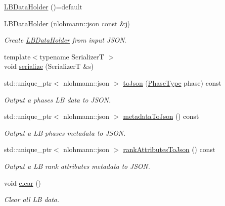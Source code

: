 \begin{DoxyCompactItemize}
\item 
\hyperlink{structvt_1_1vrt_1_1collection_1_1balance_1_1_l_b_data_holder_aa1785b744e5b844588f9e8038aa2ef1e}{L\+B\+Data\+Holder} ()=default
\item 
\hyperlink{structvt_1_1vrt_1_1collection_1_1balance_1_1_l_b_data_holder_a0bf21f167ccc736cd1f763aceda3a90d}{L\+B\+Data\+Holder} (nlohmann\+::json const \&j)
\begin{DoxyCompactList}\small\item\em Create {\ttfamily \hyperlink{structvt_1_1vrt_1_1collection_1_1balance_1_1_l_b_data_holder}{L\+B\+Data\+Holder}} from input J\+S\+ON. \end{DoxyCompactList}\item 
{\footnotesize template$<$typename SerializerT $>$ }\\void \hyperlink{structvt_1_1vrt_1_1collection_1_1balance_1_1_l_b_data_holder_ae7701331d40846773d0dc359621fab25}{serialize} (SerializerT \&s)
\item 
std\+::unique\+\_\+ptr$<$ nlohmann\+::json $>$ \hyperlink{structvt_1_1vrt_1_1collection_1_1balance_1_1_l_b_data_holder_aeea29fc72556da9038290ef94fb01bc9}{to\+Json} (\hyperlink{namespacevt_a46ce6733d5cdbd735d561b7b4029f6d7}{Phase\+Type} phase) const
\begin{DoxyCompactList}\small\item\em Output a phase\textquotesingle{}s LB data to J\+S\+ON. \end{DoxyCompactList}\item 
std\+::unique\+\_\+ptr$<$ nlohmann\+::json $>$ \hyperlink{structvt_1_1vrt_1_1collection_1_1balance_1_1_l_b_data_holder_aff15ecfd3ffecaa3f6754621c496fc8c}{metadata\+To\+Json} () const
\begin{DoxyCompactList}\small\item\em Output a LB phase\textquotesingle{}s metadata to J\+S\+ON. \end{DoxyCompactList}\item 
std\+::unique\+\_\+ptr$<$ nlohmann\+::json $>$ \hyperlink{structvt_1_1vrt_1_1collection_1_1balance_1_1_l_b_data_holder_a92eb060e578a7fb8c317d9184a7236db}{rank\+Attributes\+To\+Json} () const
\begin{DoxyCompactList}\small\item\em Output a LB rank attributes metadata to J\+S\+ON. \end{DoxyCompactList}\item 
void \hyperlink{structvt_1_1vrt_1_1collection_1_1balance_1_1_l_b_data_holder_a77ed15a18bb662403a65fa8fe4d4d6dc}{clear} ()
\begin{DoxyCompactList}\small\item\em Clear all LB data. \end{DoxyCompactList}\end{DoxyCompactItemize}
